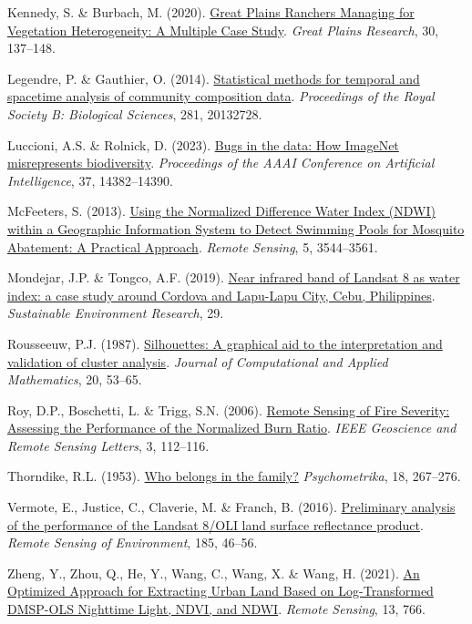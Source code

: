 \documentclass[
  letterpaper,
]{scrbook}
\newlength{\cslhangindent}
\newenvironment{CSLReferences}[2] %
 {\begin{list}{}{%
  \setlength{\itemindent}{0pt}
  \setlength{\leftmargin}{0pt}
  \setlength{\parsep}{0pt}
  \ifodd #1
   \setlength{\leftmargin}{\cslhangindent}
   \setlength{\itemindent}{-1\cslhangindent}
  \fi
  \setlength{\itemsep}{#2\baselineskip}}}
 {\end{list}}
\begin{document}
\begin{CSLReferences}{1}{0}
Kennedy, S. \& Burbach, M. (2020).
\href{https://doi.org/10.1353/gpr.2020.0016}{Great Plains Ranchers
Managing for Vegetation Heterogeneity: A Multiple Case Study}.
\emph{Great Plains Research}, 30, 137--148.

Legendre, P. \& Gauthier, O. (2014).
\href{https://doi.org/10.1098/rspb.2013.2728}{Statistical methods for
temporal and space{\textendash}time analysis of community composition
data}. \emph{Proceedings of the Royal Society B: Biological Sciences},
281, 20132728.

Luccioni, A.S. \& Rolnick, D. (2023).
\href{https://doi.org/10.1609/aaai.v37i12.26682}{Bugs in the data: How
ImageNet misrepresents biodiversity}. \emph{Proceedings of the AAAI
Conference on Artificial Intelligence}, 37, 14382--14390.

McFeeters, S. (2013). \href{https://doi.org/10.3390/rs5073544}{Using the
Normalized Difference Water Index (NDWI) within a Geographic Information
System to Detect Swimming Pools for Mosquito Abatement: A Practical
Approach}. \emph{Remote Sensing}, 5, 3544--3561.

Mondejar, J.P. \& Tongco, A.F. (2019).
\href{https://doi.org/10.1186/s42834-019-0016-5}{Near infrared band of
Landsat 8 as water index: a case study around Cordova and Lapu-Lapu
City, Cebu, Philippines}. \emph{Sustainable Environment Research}, 29.

Rousseeuw, P.J. (1987).
\href{https://doi.org/10.1016/0377-0427(87)90125-7}{Silhouettes: A
graphical aid to the interpretation and validation of cluster analysis}.
\emph{Journal of Computational and Applied Mathematics}, 20, 53--65.

Roy, D.P., Boschetti, L. \& Trigg, S.N. (2006).
\href{https://doi.org/10.1109/lgrs.2005.858485}{Remote Sensing of Fire
Severity: Assessing the Performance of the Normalized Burn Ratio}.
\emph{IEEE Geoscience and Remote Sensing Letters}, 3, 112--116.

Thorndike, R.L. (1953). \href{https://doi.org/10.1007/bf02289263}{Who
belongs in the family?} \emph{Psychometrika}, 18, 267--276.

Vermote, E., Justice, C., Claverie, M. \& Franch, B. (2016).
\href{https://doi.org/10.1016/j.rse.2016.04.008}{Preliminary analysis of
the performance of the Landsat 8/OLI land surface reflectance product}.
\emph{Remote Sensing of Environment}, 185, 46--56.

Zheng, Y., Zhou, Q., He, Y., Wang, C., Wang, X. \& Wang, H. (2021).
\href{https://doi.org/10.3390/rs13040766}{An Optimized Approach for
Extracting Urban Land Based on Log-Transformed DMSP-OLS Nighttime Light,
NDVI, and NDWI}. \emph{Remote Sensing}, 13, 766.

\end{CSLReferences}
\end{document}
